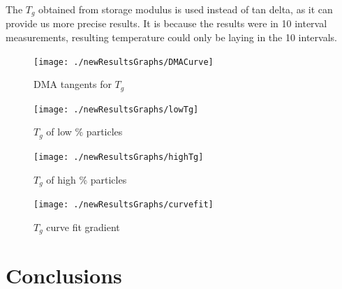 \documentclass[numbers=noendperiod,chapterprefix=on]{icldt} %
\begin{document}
The $T_g$ obtained from storage modulus is used instead of tan delta, as it can provide us more precise results. It is because the results were in 10 interval measurements, resulting temperature could only be laying in the 10 intervals.   


\begin{figure}[!hp]
\centering
\texttt{[image: ./newResultsGraphs/DMACurve]}
\caption{DMA tangents for $T_g$}\label{DMACurve}
\end{figure}
\FloatBarrier

\begin{figure}[!hp]
\centering
\texttt{[image: ./newResultsGraphs/lowTg]}
\caption {$T_g$ of low \% particles}\label{low $T_{g}$}
\end{figure}
\FloatBarrier

\begin{figure}[!hp]
\centering
\texttt{[image: ./newResultsGraphs/highTg]}
\caption {$T_g$ of high \% particles}\label{high$ T_{g} $}
\end{figure}
\FloatBarrier

\begin{figure}[!hp]
\centering
\texttt{[image: ./newResultsGraphs/curvefit]}
\caption {$T_g$ curve fit gradient}\label{curvefit}
\end{figure}
\FloatBarrier

\chapter{Conclusions}
\end{document}
